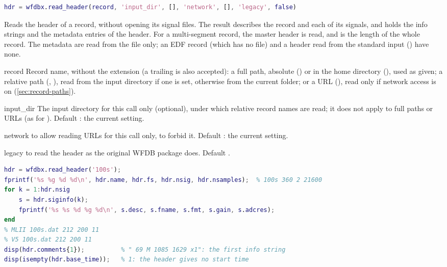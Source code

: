 \begin{lstlisting}[language=Matlab,style=signature]
hdr = wfdbx.read_header(record, 'input_dir', [], 'network', [], 'legacy', false)
\end{lstlisting}
Reads the header of a record, without opening its signal files. The result describes the
record and each of its signals, and holds the info strings and the metadata entries of the
header. For a multi-segment record, the master header is read, and  is the
length of the whole record. The metadata are read from the  file only; an EDF
record (which has no  file) and a header read from the standard input
() have none.
\begin{params}
\item[record] Record name, without the  extension (a trailing 
  is also accepted): a full path, absolute () or in the home
  directory (), used as given; a relative path
  (, ), read from the input directory if one is set,
  otherwise from the current folder; or a URL
  (), read only if network access is
  on (\cref{sec:record-paths}).
\item[input\_dir] The input directory for this call only (optional), under which
  relative record names are read; it does not apply to full paths or URLs (as for
  ). Default \code{[]}: the current setting.
\item[network]  to allow reading URLs for this call only,  to
  forbid it. Default \code{[]}: the current setting.
\item[legacy]  to read the header as the original WFDB package does. Default
  .
\end{params}
\begin{lstlisting}[language=Matlab,style=example]
hdr = wfdbx.read_header('100s');
fprintf('%s %g %d %d\n', hdr.name, hdr.fs, hdr.nsig, hdr.nsamples);  % 100s 360 2 21600
for k = 1:hdr.nsig
    s = hdr.siginfo(k);
    fprintf('%s %s %d %g %d\n', s.desc, s.fname, s.fmt, s.gain, s.adcres);
end
% MLII 100s.dat 212 200 11
% V5 100s.dat 212 200 11
disp(hdr.comments{1});          % " 69 M 1085 1629 x1": the first info string
disp(isempty(hdr.base_time));   % 1: the header gives no start time
\end{lstlisting}

